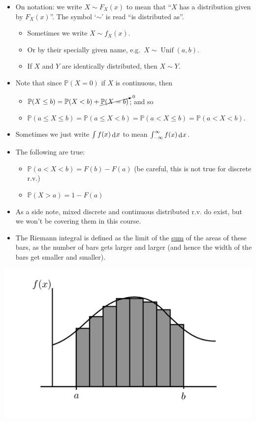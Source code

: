 \documentclass[
]{book}
\providecommand{\tightlist}{%
  \setlength{\itemsep}{0pt}\setlength{\parskip}{0pt}}
\DeclareMathOperator{\Unif}{Unif}
\newcommand{\bbP}{\mathbb{P}}
\DeclareMathOperator{\dd}{d}
\newcommand{\dint}{\dd\hspace{0.5pt}\!}
\theoremstyle{definition}
\theoremstyle{definition}
\theoremstyle{definition}
\theoremstyle{definition}
\theoremstyle{remark}
\begin{document}
\begin{itemize}
\item
  On notation: we write \(X \sim F_X(x)\) to mean that ``\(X\) has a distribution given by \(F_X(x)\)''. The symbol `\(\sim\)' is read ``is distributed as''.

  \begin{itemize}
  \tightlist
  \item
    Sometimes we write \(X \sim f_X(x)\).
  \item
    Or by their specially given name, e.g.~\(X\sim \Unif(a,b)\).
  \item
    If \(X\) and \(Y\) are identically distributed, then \(X\sim Y\).
  \end{itemize}
\item
  Note that since \(\bbP(X=0)\) if \(X\) is continuous, then

  \begin{itemize}
  \tightlist
  \item
    \(\bbP(X \leq b) = \bbP(X <b) + \cancelto{0}{\bbP(X=b)}\); and so
  \item
    \(\bbP(a \leq X \leq b) = \bbP(a \leq X < b) = \bbP(a < X \leq b) = \bbP(a < X < b)\).
  \end{itemize}
\item
  Sometimes we just write \(\int f(x) \dint x\) to mean \(\int_{-\infty}^{\infty} f(x) \dint x\).
\item
  The following are true:

  \begin{itemize}
  \tightlist
  \item
    \(\bbP(a<X<b) = F(b) - F(a)\) (be careful, this is not true for discrete r.v.)
  \item
    \(\bbP(X > a) = 1 - F(a)\)
  \end{itemize}
\item
  As a side note, mixed discrete and continuous distributed r.v. do exist, but we won't be covering them in this course.
\item
  The Riemann integral is defined as the limit of the \underline{sum} of the areas of these bars, as the number of bars gets larger and larger (and hence the width of the bars get smaller and smaller).
\end{itemize}

\includegraphics{figure/riemann_integration.png}
\end{document}
